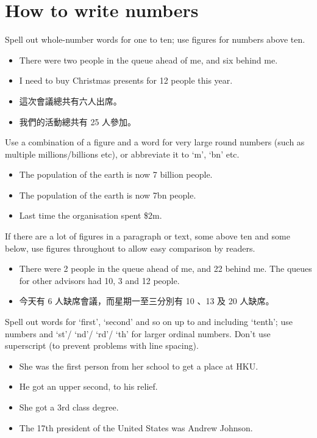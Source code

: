 \documentclass[11pt,a4paper]{book}
\newcommand{\xmark}{{\color{cadmiumred}\ding{54}}}%
\newcommand{\cmark}{{\color{green(html/cssgreen)}\checkmark}}%
\begin{document}
			\section{How to write numbers}
			Spell out whole-number words for one to ten; use figures for numbers above ten.
			{\firasans \begin{mdframed}[backgroundcolor=aliceblue] \begin{itemize}[label=\cmark]
				\item There were two people in the queue ahead of me, and six behind me.
				\item I need to buy Christmas presents for 12 people this year.
				\item 這次會議總共有六人出席。
				\item 我們的活動總共有 25 人參加。
			\end{itemize} \end{mdframed} }
			Use a combination of a figure and a word for very large round numbers (such as multiple millions/billions etc), or abbreviate it to `m', `bn' etc.
			{\firasans \begin{mdframed}[backgroundcolor=aliceblue] \begin{itemize}[label=\cmark]
				\item The population of the earth is now 7 billion people.
				\item The population of the earth is now 7bn people.
				\item Last time the organisation spent \$2m.
			\end{itemize} \end{mdframed} }
			If there are a lot of figures in a paragraph or text, some above ten and some below, use figures throughout to allow easy comparison by readers.
			{\firasans \begin{mdframed}[backgroundcolor=aliceblue] \begin{itemize}[label=\cmark]
				\item  There were 2 people in the queue ahead of me, and 22 behind me. The queues for other advisors had 10, 3 and 12 people.
				\item 今天有 6 人缺席會議，而星期一至三分別有 10 、13 及 20 人缺席。
			\end{itemize} \end{mdframed} }
			Spell out words for `first', `second' and so on up to and including `tenth'; use numbers and `st'/ `nd'/ `rd'/ `th' for larger ordinal numbers. Don't use superscript (to prevent problems with line spacing).
			{\firasans \begin{mdframed}[backgroundcolor=aliceblue] \begin{itemize}[label=\cmark]
				\item She was the first person from her school to get a place at HKU.
				\item He got an upper second, to his relief.
				\item[\xmark] She got a 3rd class degree.
				\item The 17th president of the United States was Andrew Johnson.
			\end{itemize} \end{mdframed} }
\end{document}
